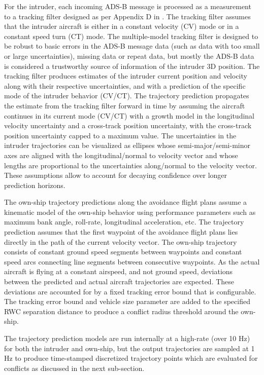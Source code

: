 For the intruder, each incoming ADS-B message is processed as a measurement to a tracking filter designed as per Appendix D in \cite{DO_366A}. The tracking filter assumes that the intruder aircraft is either in a constant velocity (CV) mode or in a constant speed turn (CT) mode. The multiple-model tracking filter is designed to be robust to basic errors in the ADS-B message data (such as data with too small or large uncertainties), missing data or repeat data, but mostly the ADS-B data is considered a trustworthy source of information of the intruder 3D position. The tracking filter produces estimates of the intruder current position and velocity along with their respective uncertainties, and with a prediction of the specific mode of the intruder behavior (CV/CT). The trajectory prediction propagates the estimate from the tracking filter forward in time by assuming the aircraft continues in its current mode (CV/CT) with a growth model in the longitudinal velocity uncertainty and a cross-track position uncertainty, with the cross-track position uncertainty capped to a maximum value. The uncertainties in the intruder trajectories can be visualized as ellipses whose semi-major/semi-minor axes are aligned with the longitudinal/normal to velocity vector and whose lengths are proportional to the uncertainties along/normal to the velocity vector. These assumptions allow to account for decaying confidence over longer prediction horizons.

The own-ship trajectory predictions along the avoidance flight plans assume a kinematic model of the own-ship behavior using performance parameters such as maximum bank angle, roll-rate, longitudinal acceleration, etc. The trajectory prediction assumes that the first waypoint of the avoidance flight plans lies directly in the path of the current velocity vector. The own-ship trajectory consists of constant ground speed segments between waypoints and constant speed arcs connecting line segments between consecutive waypoints. As the actual aircraft is flying at a constant airspeed, and not ground speed, deviations between the predicted and actual aircraft trajectories are expected. These deviations are accounted for by a fixed tracking error bound that is configurable. The tracking error bound and vehicle size parameter are added to the specified RWC separation distance to produce a conflict radius threshold around the own-ship.

The trajectory prediction models are run internally at a high-rate (over 10 Hz) for both the intruder and own-ship, but the output trajectories are sampled at 1 Hz to produce time-stamped discretized trajectory points which are evaluated for conflicts as discussed in the next sub-section.


